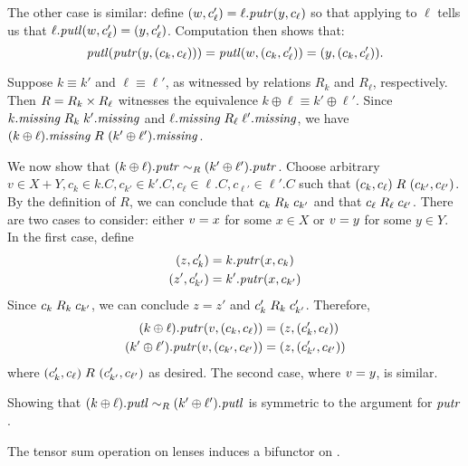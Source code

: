\begin{defn}[$R$-similarity]
\begin{theorem}
\begin{lemma}
\begin{theorem}[No products]
\begin{goodlens}
The other case is similar: define $(w,c_\ell') = \ell.\mathit{putr}(y,c_\ell)$ so
that applying  to $\ell$ tells us that
$\ell.\mathit{putl}(w,c_\ell')=(y,c_\ell')$. Computation then shows that:
\[\putl(\putr(\mlinr y,(c_k,c_\ell))) = \putl(\mlinr w,(c_k,c_\ell')) =
    (\mlinr y,(c_k,c_\ell'))\text{.\endofpf}\]
\end{goodlens}

\begin{lenseqv}
Suppose $k \equiv k'$ and $\ell \equiv \ell'$, as witnessed by relations
$R_k$ and $R_\ell$, respectively. Then $R = R_k \times R_\ell$
witnesses the equivalence $k \oplus \ell \equiv k' \oplus \ell'$. Since
$k.\mathit{missing} \mathrel{R_{k}} k'.\mathit{missing}$ and $\ell.\mathit{missing} \mathrel{R_{\ell}} \ell'.\mathit{missing}$,
we have $(k\oplus\ell).\mathit{missing} \mathrel{R_{}} (k'\oplus\ell').\mathit{missing}$.

We now show that $(k\oplus\ell).\mathit{putr} \sim_R (k'\oplus\ell').\mathit{putr}$. Choose
arbitrary $v \in X+Y,c_k \in k.C,c_{k'} \in k'.C,c_\ell \in
\ell.C,c_{\ell'} \in \ell'.C$ such that $(c_k,c_\ell) \mathrel{R_{}}
(c_{k'},c_{\ell'})$. By the definition of $R$, we can conclude that $c_k
\mathrel{R_{k}} c_{k'}$ and that $c_\ell \mathrel{R_{\ell}} c_{\ell'}$.  There are two cases to
consider: either $v =  x$ for some $x \in X$ or $v =  y$ for
some $y \in Y$. In the first case, define
\begin{align*}
    (z,c_k') &= k.\mathit{putr}(x,c_k) \\
    (z',c_{k'}') &= k'.\mathit{putr}(x,c_{k'})
\end{align*}
Since $c_k \mathrel{R_{k}} c_{k'}$, we can conclude $z=z'$ and $c_k' \mathrel{R_{k}} c_{k'}'$.
Therefore,
\begin{align*}
    (k\oplus\ell).\mathit{putr}(v,(c_k,c_\ell)) &= ( z,(c_k',c_\ell)) \\
    (k'\oplus\ell').\mathit{putr}(v,(c_{k'},c_{\ell'})) &= ( z,(c_{k'}',c_{\ell'}))
\end{align*}
where $(c_k',c_\ell) \mathrel{R_{}} (c_{k'}',c_{\ell'})$ as desired. The second case,
where $v =  y$, is similar.

Showing that $(k\oplus\ell).\mathit{putl} \sim_R (k'\oplus\ell').\mathit{putl}$ is symmetric
to the argument for $\mathit{putr}$.
\end{lenseqv}

\iffull
\begin{lemma}
\else
\begin{lemma}
\fi
The tensor sum operation on lenses induces a bifunctor on \LENS{}.
\end{lemma}


\end{lemma}
\end{theorem}
\end{lemma}
\end{theorem}
\end{defn}

